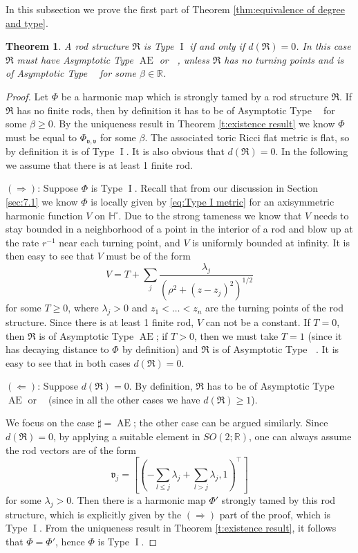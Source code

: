 \documentclass[a4paper,11pt]{amsart}
\newtheorem{theorem}{Theorem}[section]
\theoremstyle{definition}
\numberwithin{equation}{section}
\newcommand{\dH}{\mathbb{H}}
\newcommand{\R}{\mathbb{R}}
\newcommand{\mv} {\mathfrak v}
\newcommand{\mR} {\mathfrak R}
\DeclareMathOperator{\I}{I}
\DeclareMathOperator{\Ae}{AE}
\DeclareMathOperator{\TNap}{TN^+_\alpha}
\DeclareMathOperator{\ALFp}{ALF^+}
\DeclareMathOperator{\AFa}{AF_\beta}
\begin{document}
    
In this subsection we prove the first part of Theorem \ref{thm:equivalence of degree and type}. 
\begin{theorem} \label{thm:Type I equivalent to degree 0}
A rod structure $\mR$ is Type $\I$ if and only if $d(\mathfrak R)=0$. In this case $\mR$ must have Asymptotic Type  $\Ae$ or $\ALFp$, unless $\mR$ has no turning points and is of  Asymptotic Type  $\AFa$ for some  $\beta\in \R$.
\end{theorem}

\begin{proof}
 Let $\Phi$ be a harmonic map  which is  strongly tamed by a rod structure $\mR$. 
If $\mR$ has no finite rods, then by definition it has to be of Asymptotic Type  $\AFa$ for some $\beta\geq 0$. By the uniqueness result in Theorem \ref{t:existence result} we know $\Phi$ must be equal to $\Phi^{\AFa}_{\mv, \mv}$ for some $\beta$. The associated toric Ricci flat metric is flat, so by definition it is of Type $\I$. It is also obvious that $d(\mR)=0$.  In the following we assume that there is at least 1 finite rod.
    
    $(\Rightarrow)$: Suppose $\Phi$ is Type $\I$.   Recall that from our discussion in Section \ref{sec:7.1} we know $\Phi$ is locally  given by \eqref{eq:Type I metric}  for an axisymmetric harmonic function $V$ on $\dH^\circ$. 
    Due to the strong tameness we know that $V$ needs to stay bounded in a neighborhood of a point in the interior of a rod and blow up at the rate $r^{-1}$ near each turning point, and $V$ is uniformly bounded at infinity. It is then easy to see that $V$ must be of the form
        $$V=T+\sum_j\frac{\lambda_j}{(\rho^2+(z-z_j)^2)^{1/2}}$$
 for some $T\geq 0$, where $\lambda_j>0$ and $z_1<\ldots<z_n$ are the turning points of the rod structure. Since there is at least 1 finite rod, $V$ can not be a constant. If $T=0$, then $\mR$ is of Asymptotic Type  $\Ae$; if $T>0$, then we must take $T=1$ (since it has decaying distance to $\Phi^{\TNap}$ by definition) and $\mR$ is of Asymptotic Type  $\ALFp$. It is easy to see that in both cases $d(\mR)=0$.

    
    
    $(\Leftarrow)$: Suppose $d(\mR)=0$. By definition, $\mR$ has to be of Asymptotic Type  $\Ae$ or $\ALFp$ (since in all the other cases we have $d(\mR)\geq 1$).
    
    
   We focus on the case $\sharp=\Ae$; the other case can be argued similarly. Since $d(\mathfrak R)=0$, by applying a suitable element in $SO(2;\mathbb R)$, one can always assume the rod vectors are of the form
   \begin{equation}\label{eqn:normalized rod vectors Gibbons-Hawking}\mathfrak{v}_j=[(-\sum_{l\leq j}\lambda_j+\sum_{l>j}\lambda_j,1)^{\top}]
   \end{equation}
    for some $\lambda_j>0$.
    Then there is a harmonic map $\Phi'$  strongly tamed by this rod structure, which is   explicitly given by the $(\Rightarrow)$ part of the proof, which is Type $\I$. From the uniqueness result in Theorem \ref{t:existence result}, it follows that $\Phi=\Phi'$, hence $\Phi$ is Type $\I$.
\end{proof}
\end{document}
